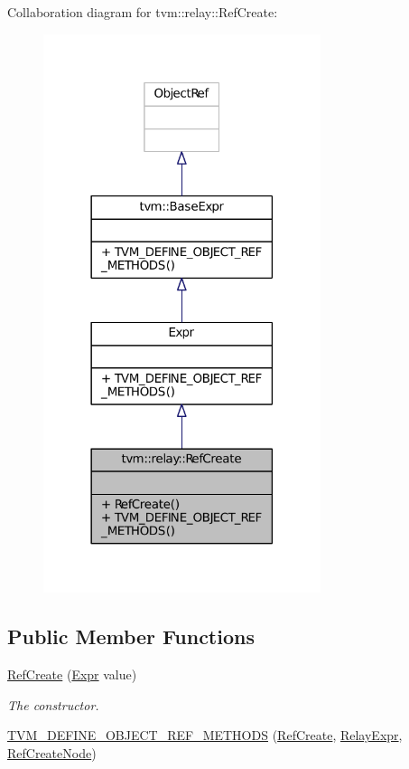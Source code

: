 Collaboration diagram for tvm\+:\+:relay\+:\+:Ref\+Create\+:
\nopagebreak
\begin{figure}[H]
\begin{center}
\leavevmode
\includegraphics[width=230pt]{classtvm_1_1relay_1_1RefCreate__coll__graph}
\end{center}
\end{figure}
\subsection*{Public Member Functions}
\begin{DoxyCompactItemize}
\item 
\hyperlink{classtvm_1_1relay_1_1RefCreate_add3a3ba4171f3fdb84917ce2132fd9d4}{Ref\+Create} (\hyperlink{namespacetvm_1_1relay_a5b84e3790f89bb3fad5c7911eeb99531}{Expr} value)
\begin{DoxyCompactList}\small\item\em The constructor. \end{DoxyCompactList}\item 
\hyperlink{classtvm_1_1relay_1_1RefCreate_ac6597fe374b154b296ddb84c01a803a4}{T\+V\+M\+\_\+\+D\+E\+F\+I\+N\+E\+\_\+\+O\+B\+J\+E\+C\+T\+\_\+\+R\+E\+F\+\_\+\+M\+E\+T\+H\+O\+DS} (\hyperlink{classtvm_1_1relay_1_1RefCreate}{Ref\+Create}, \hyperlink{classtvm_1_1RelayExpr}{Relay\+Expr}, \hyperlink{classtvm_1_1relay_1_1RefCreateNode}{Ref\+Create\+Node})
\end{DoxyCompactItemize}


